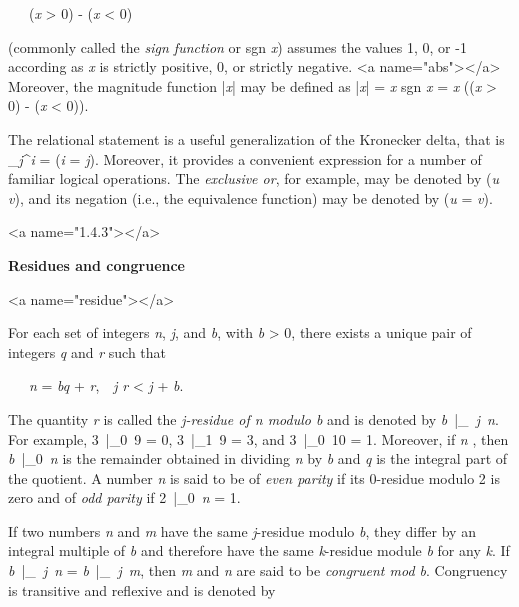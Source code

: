 \par \ \ \ (\textit{x} > 0) - (\textit{x} < 0)

\par (commonly called the \textit{sign function} or sgn \textit{x}) assumes the values 1, 0, or -1 according as
\textit{x} is strictly positive, 0, or strictly negative.
<a name="abs"></a> Moreover, the magnitude function |\textit{x}| may be defined as |\textit{x}| = \textit{x} \times sgn \textit{x} = 
\textit{x} \times ((\textit{x} > 0) - (\textit{x} < 0)).

\par The relational statement is a useful generalization of the Kronecker delta, that is 
\textit{\delta}_{\textit{j}}^{\textit{i}} = (\textit{i} = \textit{j}). Moreover, it provides a convenient expression for a number of familiar logical operations. The \textit{exclusive or}, for example, may be denoted by (\textit{u} \neq \textit{v}), and its negation (i.e., the equivalence function) may be denoted by (\textit{u} = \textit{v}).



<a name="1.4.3"></a>
\par \textbf{Residues and congruence}

<a name="residue"></a>
\par For each set of integers \textit{n}, \textit{j}, and \textit{b}, with \textit{b} > 0, there exists a unique pair of integers
\textit{q} and \textit{r} such that

\par \ \ \ \textit{n} = \textit{b}\textit{q} + \textit{r},\ \ 
\textit{j} \leq \textit{r} < \textit{j} + \textit{b}.

\par The quantity \textit{r} is called the \textit{j-residue of n modulo b} and is denoted by \textit{b}\ |_{\textit{\ j}}\ \textit{n}. For example, 3\ |_{0}\ 9 = 0, 3\ |_{1}\ 9 = 3, and 3\ |_{0}\ 10 = 1. Moreover, if \textit{n} , then \textit{b}\ |_{0}\ \textit{n} is the remainder obtained in dividing \textit{n} by \textit{b} and \textit{q} is the integral part of the quotient. A number \textit{n} is said to be of \textit{even parity} if its 0-residue modulo 2 is zero and of \textit{odd parity} if 2\ |_{0}\ \textit{n} = 1.

\par If two numbers \textit{n} and \textit{m} have the same \textit{j}-residue modulo \textit{b}, they differ by an integral multiple of \textit{b} and therefore have the same \textit{k}-residue module \textit{b} for any \textit{k}. If \textit{b}\ |_{\textit{\ j}}\ \textit{n} =
\textit{b}\ |_{\textit{\ j}}\ \textit{m}, then \textit{m} and \textit{n} are said to be
\textit{congruent mod b}. Congruency is transitive and reflexive and is denoted by

